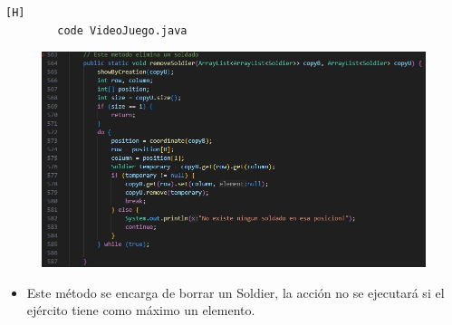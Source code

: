 \documentclass{article}
\begin{document}
	
	
	
	
	\begin{lstlisting}[language=bash,caption={Se implementa el método para eliminar un Soldier }][H]
		code VideoJuego.java
	\end{lstlisting}
	
	\begin{figure}[H]
		\centering
		\includegraphics[width=1\textwidth,keepaspectratio]{img/removeSoldier.jpg}
	\end{figure}
	
	
	\begin{itemize}	
		\item Este método se encarga de borrar un Soldier, la acción no se ejecutará si el ejército tiene como máximo un elemento.
	\end{itemize}
	
\end{document}

